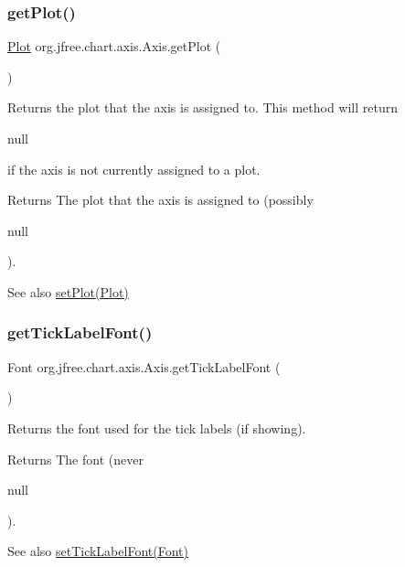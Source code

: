 \subsubsection{\texorpdfstring{get\+Plot()}{getPlot()}}
{\footnotesize\ttfamily \mbox{\hyperlink{classorg_1_1jfree_1_1chart_1_1plot_1_1_plot}{Plot}} org.\+jfree.\+chart.\+axis.\+Axis.\+get\+Plot (\begin{DoxyParamCaption}{ }\end{DoxyParamCaption})}

Returns the plot that the axis is assigned to. This method will return 
\begin{DoxyCode}
null 
\end{DoxyCode}
 if the axis is not currently assigned to a plot.

\begin{DoxyReturn}{Returns}
The plot that the axis is assigned to (possibly
\begin{DoxyCode}
null 
\end{DoxyCode}
 ).
\end{DoxyReturn}
\begin{DoxySeeAlso}{See also}
\mbox{\hyperlink{classorg_1_1jfree_1_1chart_1_1axis_1_1_axis_aef0fc147d7e44ccf2c020e223c6c34ca}{set\+Plot(\+Plot)}} 
\end{DoxySeeAlso}
\mbox{\label{classorg_1_1jfree_1_1chart_1_1axis_1_1_axis_afa78f4c22da7b2d268e127767789ed4d}} 
\subsubsection{\texorpdfstring{get\+Tick\+Label\+Font()}{getTickLabelFont()}}
{\footnotesize\ttfamily Font org.\+jfree.\+chart.\+axis.\+Axis.\+get\+Tick\+Label\+Font (\begin{DoxyParamCaption}{ }\end{DoxyParamCaption})}

Returns the font used for the tick labels (if showing).

\begin{DoxyReturn}{Returns}
The font (never
\begin{DoxyCode}
null 
\end{DoxyCode}
 ).
\end{DoxyReturn}
\begin{DoxySeeAlso}{See also}
\mbox{\hyperlink{classorg_1_1jfree_1_1chart_1_1axis_1_1_axis_a2a73b99f22d1d3d2a2b9f6e0feb4fcad}{set\+Tick\+Label\+Font(\+Font)}} 
\end{DoxySeeAlso}
\mbox{\label{classorg_1_1jfree_1_1chart_1_1axis_1_1_axis_a1916ea69816af319a66834961b52b6f6}} 
